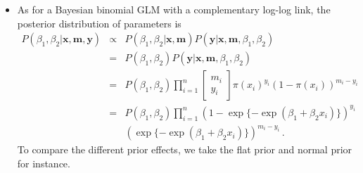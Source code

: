 \documentclass[]{article}
\begin{document}
\begin{enumerate}
{\begin{itemize}
        \end{itemize}
        
        \item[Sol 2]
        \begin{itemize}
        	\item[(a)]
        	As for a Bayesian binomial GLM with a complementary log-log link, the posterior distribution of parameters is
        	\begin{eqnarray}
        	P(\beta_1, \beta_2|\bm x, \bm m, \bm y) & \propto & P(\beta_1, \beta_2|\bm x, \bm m)P(\bm y|\bm x, \bm m, \beta_1, \beta_2)\\
        	& = & P(\beta_1, \beta_2)P(\bm y| \bm x, \bm m, \beta_1, \beta_2)\\
        	& = & P(\beta_1, \beta_2)\prod_{i = 1}^{n}\begin{bmatrix}
        	m_i\\y_i
        	\end{bmatrix}\pi(x_i)^{y_i}(1-\pi(x_i))^{m_i-y_i}\\
        	& = & P(\beta_1, \beta_2) \prod_{i = 1}^{n}(1- \exp\{-\exp(\beta_1+\beta_2x_i)\})^{y_i}\\
        	& &(\exp\{-\exp(\beta_1+\beta_2x_i)\})^{m_i-y_i}\,.
        	\end{eqnarray}
            To compare the different prior effects, we take the flat prior and normal prior for instance.

\end{itemize}}
\end{enumerate}
\end{document}
